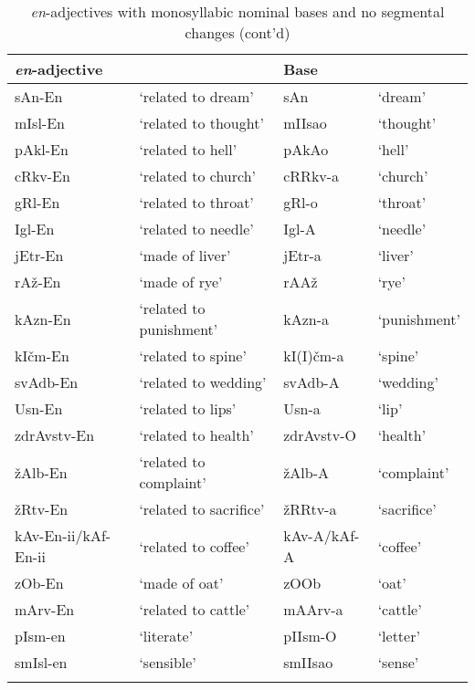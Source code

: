 \documentclass[output=paper]{langsci/langscibook}
\begin{document}
\begin{table}     
\caption{\textit{en}-adjectives with monosyllabic nominal bases and no segmental changes (cont'd)}          
\label{tabapp9}          
 \begin{tabular}{ l l l l}          
\lsptoprule            
\textit{en}-adjective &  & Base &   \\
\hline 
sAn-En & `related to dream' & sAn & `dream' \\
  mIsl-En & `related to thought' & mIIsao & `thought' \\
  pAkl-En & `related to hell' & pAkAo & `hell' \\
  cRkv-En & `related to church' & cRRkv-a & `church'\\ 
  gRl-En & `related to throat' & gRl-o & `throat' \\
  Igl-En & `related to needle' & Igl-A & `needle'\\ 
  jEtr-En & `made of liver' & jEtr-a & `liver' \\
  rAž-En & `made of rye' & rAAž & `rye' \\
  kAzn-En & `related to punishment' & kAzn-a & `punishment' \\
  kIčm-En  & `related to spine' & kI(I)čm-a & `spine' \\
  svAdb-En & `related to wedding' & svAdb-A & `wedding' \\
  Usn-En & `related to lips' & Usn-a & `lip' \\
  zdrAvstv-En & `related to health' & zdrAvstv-O & `health' \\
  žAlb-En & `related to complaint' & žAlb-A & `complaint' \\
  žRtv-En & `related to sacrifice' & žRRtv-a & `sacrifice' \\
  kAv-En-ii/kAf-En-ii & `related to coffee' & kAv-A/kAf-A & `coffee' \\
  zOb-En & `made of oat' & zOOb & `oat' \\
  mArv-En & `related to cattle' & mAArv-a & `cattle' \\
  pIsm-en & `literate' & pIIsm-O & `letter' \\
smIsl-en & `sensible' & smIIsao & `sense' \\
 \lspbottomrule         
 \end{tabular}          
\end{table}           
          
\end{document}
